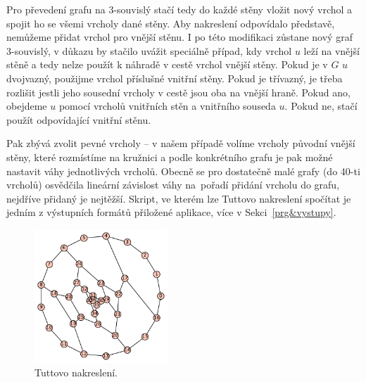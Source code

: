 Pro převedení grafu na 3-souvislý stačí tedy do každé stěny vložit nový vrchol a spojit ho se všemi vrcholy dané stěny. Aby nakreslení odpovídalo představě, nemůžeme přidat vrchol pro vnější stěnu. I po této modifikaci zůstane nový graf 3-souvislý, v důkazu by stačilo uvážit speciálně případ, kdy vrchol $u$ leží na vnější stěně a tedy nelze použít k náhradě v cestě vrchol vnější stěny. Pokud je v $G$ $u$ dvojvazný, použijme vrchol příslušné vnitřní stěny. Pokud je třívazný, je třeba rozlišit jestli jeho sousední vrcholy v cestě jsou oba na vnější hraně. Pokud ano, obejdeme $u$ pomocí vrcholů vnitřních stěn a vnitřního souseda $u$. Pokud ne, stačí použít odpovídající vnitřní stěnu. 

Pak zbývá zvolit pevné vrcholy -- v našem případě volíme vrcholy původní vnější stěny, které rozmístíme na kružnici a podle konkrétního grafu je pak možné nastavit váhy jednotlivých vrcholů. Obecně se pro dostatečně malé grafy (do 40-ti vrcholů) osvědčila lineární závislost váhy na~pořadí přidání vrcholu do grafu, nejdříve přidaný je nejtěžší. Skript, ve kterém lze Tuttovo nakreslení spočítat je jedním z výstupních formátů přiložené aplikace, více v Sekci~\ref{prg&vystupy}.


\begin{figure}[h]\centering
\includegraphics[width = 50mm]{../img/tutteplot}
\caption{Tuttovo nakreslení.}
\label{obr:tutteplot}
\end{figure}